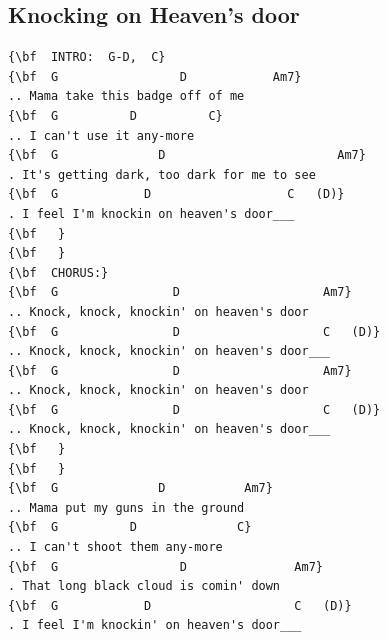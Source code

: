 \documentclass[a4paper]{article}
\begin{document}
\subsection{Knocking on Heaven's door}
\begin{Verbatim}[commandchars=\\\{\}]
{\bf  INTRO:  G-D,  C}
{\bf  G                 D            Am7}
.. Mama take this badge off of me
{\bf  G          D          C}
.. I can't use it any-more
{\bf  G              D                        Am7}
. It's getting dark, too dark for me to see
{\bf  G            D                   C   (D)}
. I feel I'm knockin on heaven's door___
{\bf   }
{\bf   }
{\bf  CHORUS:}
{\bf  G                D                    Am7}
.. Knock, knock, knockin' on heaven's door
{\bf  G                D                    C   (D)}
.. Knock, knock, knockin' on heaven's door___
{\bf  G                D                    Am7}
.. Knock, knock, knockin' on heaven's door
{\bf  G                D                    C   (D)}
.. Knock, knock, knockin' on heaven's door___
{\bf   }
{\bf   }
{\bf  G              D           Am7}
.. Mama put my guns in the ground
{\bf  G          D              C}
.. I can't shoot them any-more
{\bf  G                 D               Am7}
. That long black cloud is comin' down
{\bf  G            D                    C   (D)}
. I feel I'm knockin' on heaven's door___

\end{Verbatim}
\newpage
\end{document}

